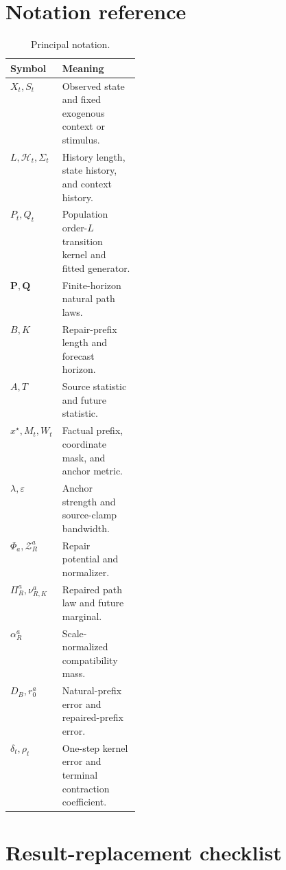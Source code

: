 \documentclass{article}
\newcommand{\Z}{\mathcal Z}
\newcommand{\Hist}{\mathcal H}
\newcommand{\PathP}{\mathbf P}
\newcommand{\PathQ}{\mathbf Q}
\newcommand{\eps}{\varepsilon}
\theoremstyle{remark}
\begin{document}
\section{Notation reference}
\label{app:notation}

\begin{table}[h]
\centering
\small
\caption{Principal notation.}
\label{tab:notation-app}
\begin{tabularx}{\linewidth}{>{\bfseries}p{0.22\linewidth}X}
\toprule
Symbol & Meaning \\
\midrule
\(X_t,S_t\) & Observed state and fixed exogenous context or stimulus.\\
\(L,\Hist_t,\Sigma_t\) & History length, state history, and context history.\\
\(P_t,Q_t\) & Population order-\(L\) transition kernel and fitted generator.\\
\(\PathP,\PathQ\) & Finite-horizon natural path laws.\\
\(B,K\) & Repair-prefix length and forecast horizon.\\
\(A,T\) & Source statistic and future statistic.\\
\(x^\star,M_t,W_t\) & Factual prefix, coordinate mask, and anchor metric.\\
\(\lambda,\eps\) & Anchor strength and source-clamp bandwidth.\\
\(\Phi_a,\Z_R^a\) & Repair potential and normalizer.\\
\(\Pi_R^a,\nu_{R,K}^a\) & Repaired path law and future marginal.\\
\(\alpha_R^a\) & Scale-normalized compatibility mass.\\
\(D_B,r_0^a\) & Natural-prefix error and repaired-prefix error.\\
\(\delta_t,\rho_t\) & One-step kernel error and terminal contraction coefficient.\\
\bottomrule
\end{tabularx}
\end{table}

\section{Result-replacement checklist}
\label{app:result-checklist}
\end{document}
